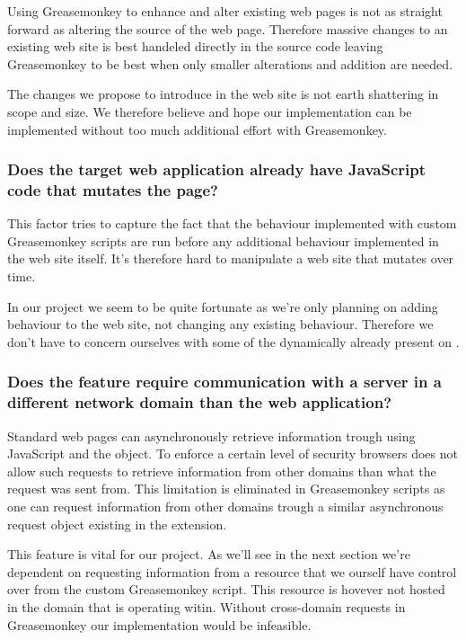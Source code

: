 Using Greasemonkey to enhance and alter existing web pages is not as straight
forward as altering the source of the web page. Therefore massive changes to
an existing web site is best handeled directly in the source code leaving
Greasemonkey to be best when only smaller alterations and addition are needed.

The changes we propose to introduce in the \urort{} web site is not earth
shattering in scope and size. We therefore believe and hope our implementation
can be implemented without too much additional effort with Greasemonkey.

\subsubsection{Does the target web application already have JavaScript code
  that mutates the page?}

This factor tries to capture the fact that the behaviour implemented with
custom Greasemonkey scripts are run before any additional behaviour
implemented in the web site itself. It's therefore hard to manipulate
a web site that mutates over time.

In our project we seem to be quite fortunate as we're only planning on adding
behaviour to the \urort{} web site, not changing any existing behaviour.
Therefore we don't have to concern ourselves with some of the dynamically
already present on \urort{}.

\subsubsection{Does the feature require communication with a server in a
  different network domain than the web application?}

Standard web pages can asynchronously retrieve information trough using
JavaScript and the  object. To enforce a certain
level of security browsers does not allow such requests to retrieve
information from other domains than what the request was sent from.
This limitation is eliminated in Greasemonkey scripts as one can request
information from other domains trough a similar asynchronous request object
existing in the extension.

This feature is vital for our project. As we'll see in the next section we're
dependent on requesting information from a resource that we ourself have
control over from the custom Greasemonkey script. This resource is hovever
not hosted in the domain that \urort{} is operating witin. Without
cross-domain requests in Greasemonkey our implementation would be infeasible.

